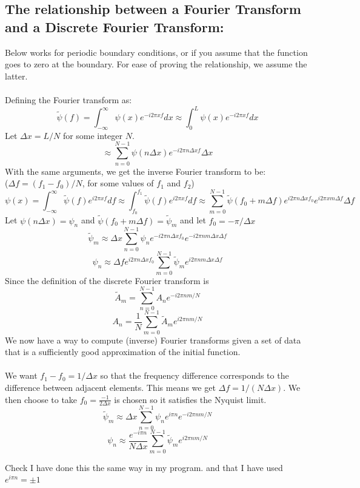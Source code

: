 \documentclass[a4paper,12pt]{report}
\begin{document}
\subsection{The relationship between a Fourier Transform and a Discrete Fourier Transform:}
Below works for periodic boundary conditions, or if you assume that the function goes to zero at the boundary. For ease of proving the relationship, we assume the latter. 
\\\\
Defining the Fourier transform as:
$$\tilde \psi(f) = \int_{-\infty}^\infty \psi(x) e^{-i2\pi xf} dx \approx \int_0^L\psi(x)e^{-i2\pi x f}dx$$
Let $\Delta x=L/N$ for some integer $N$.
$$\approx \sum\limits_{n=0}^{N-1}\psi(n \Delta x) e^{-i 2\pi n \Delta x f}\Delta x$$
With the same arguments, we get the inverse Fourier transform to be:\\ 
($\Delta f = (f_1-f_0)/N$, for some values of $f_1$ and $f_2$)
$$\psi(x) = \int_{-\infty}^\infty \tilde\psi(f)e^{i 2\pi x f} df \approx \int_{f_0}^{f_1}\tilde\psi(f)e^{i 2\pi x f}df \approx \sum\limits_{m=0}^{N-1}\tilde\psi(f_0+m\Delta f)e^{i 2\pi n\Delta x f_0} e^{i 2\pi x m\Delta f}\Delta f$$
Let $\psi(n\Delta x) = \psi_n$ and $\tilde\psi(f_0+m\Delta f) = \tilde \psi_m$ and let $f_0=-\pi/\Delta x$ 
$$\tilde \psi_m\approx \Delta x \sum\limits_{n=0}^{N-1}\psi_n e^{-i 2\pi n \Delta x f_0}e^{-i 2\pi n m \Delta x \Delta f}$$
$$\psi_n  \approx \Delta f e^{i 2\pi n\Delta x f_0}\sum\limits_{m=0}^{N-1}\tilde\psi_m e^{i 2\pi n m \Delta x \Delta f}$$
Since the definition of the discrete Fourier transform is
$$\tilde A_m =  \sum\limits_{n=0}^{N-1} A_n e^{-i 2\pi n m/N}$$
$$A_n  = \frac{1}{N}\sum\limits_{m=0}^{N-1}\tilde A_m e^{i 2\pi n m/N}$$
We now have a way to compute (inverse) Fourier transforms given a set of data that is a sufficiently good approximation of the initial function.
\\\\
We want $f_1-f_0=1/\Delta x$ so that the frequency difference corresponds to the difference between adjacent elements. This means we get $\Delta f = 1/(N\Delta x)$. We then choose to take $f_0=\frac{-1}{2\Delta x}$ is chosen so it satisfies the Nyquist limit.
$$\tilde \psi_m\approx \Delta x \sum\limits_{n=0}^{N-1}\psi_n e^{i \pi n }e^{-i 2\pi n m/N}$$
$$\psi_n  \approx \frac{e^{-i \pi n}}{N\Delta x}\sum\limits_{m=0}^{N-1}\tilde\psi_m e^{i 2\pi n m/N}$$


Check I have done this the same way in my program. and that I have used $e^{i\pi n}=\pm 1$
\end{document}

